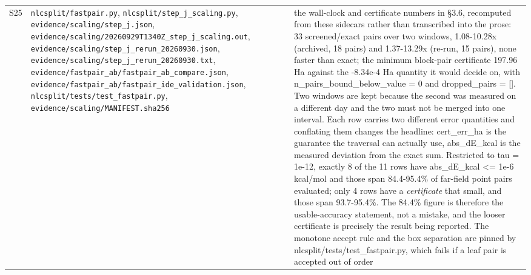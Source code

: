 \documentclass[11pt]{article}
\begin{document}
\begin{longtable}{c>{\raggedright\arraybackslash}p{}>{\raggedright\arraybackslash}p{}}
S25 & \texttt{nlcsplit/fastpair.py}, \texttt{nlcsplit/step\_j\_scaling.py}, \texttt{evidence/\allowbreak{}scaling/\allowbreak{}step\_\allowbreak{}j.json}, \texttt{evidence/\allowbreak{}scaling/\allowbreak{}20260929T1340Z\_\allowbreak{}step\_\allowbreak{}j\_\allowbreak{}scaling.out}, \texttt{evidence/\allowbreak{}scaling/\allowbreak{}step\_\allowbreak{}j\_\allowbreak{}rerun\_\allowbreak{}20260930.json}, \texttt{evidence/\allowbreak{}scaling/\allowbreak{}step\_\allowbreak{}j\_\allowbreak{}rerun\_\allowbreak{}20260930.txt}, \texttt{evidence/\allowbreak{}fastpair\_\allowbreak{}ab/\allowbreak{}fastpair\_\allowbreak{}ab\_\allowbreak{}compare.json}, \texttt{evidence/\allowbreak{}fastpair\_\allowbreak{}ab/\allowbreak{}fastpair\_\allowbreak{}ide\_\allowbreak{}validation.json}, \texttt{nlcsplit/\allowbreak{}tests/\allowbreak{}test\_\allowbreak{}fastpair.py}, \texttt{evidence/\allowbreak{}scaling/\allowbreak{}MANIFEST.sha256} & the wall-clock and certificate numbers in \S{}3.6, recomputed from these sidecars rather than transcribed into the prose: 33 screened/exact pairs over two windows, 1.08-10.28x (archived, 18 pairs) and 1.37-13.29x (re-run, 15 pairs), none faster than exact; the minimum block-pair certificate 197.96 Ha against the -8.34e-4 Ha quantity it would decide on, with n\_pairs\_bound\_below\_value = 0 and dropped\_pairs = []. Two windows are kept because the second was measured on a different day and the two must not be merged into one interval. Each row carries two different error quantities and conflating them changes the headline: cert\_err\_ha is the guarantee the traversal can actually use, abs\_dE\_kcal is the measured deviation from the exact sum. Restricted to tau = 1e-12, exactly 8 of the 11 rows have abs\_dE\_kcal <= 1e-6 kcal/mol and those span 84.4-95.4\% of far-field point pairs evaluated; only 4 rows have a \emph{certificate} that small, and those span 93.7-95.4\%. The 84.4\% figure is therefore the usable-accuracy statement, not a mistake, and the looser certificate is precisely the result being reported. The monotone accept rule and the box separation are pinned by nlcsplit/tests/test\_fastpair.py, which fails if a leaf pair is accepted out of order \\

\end{longtable}
\end{document}

